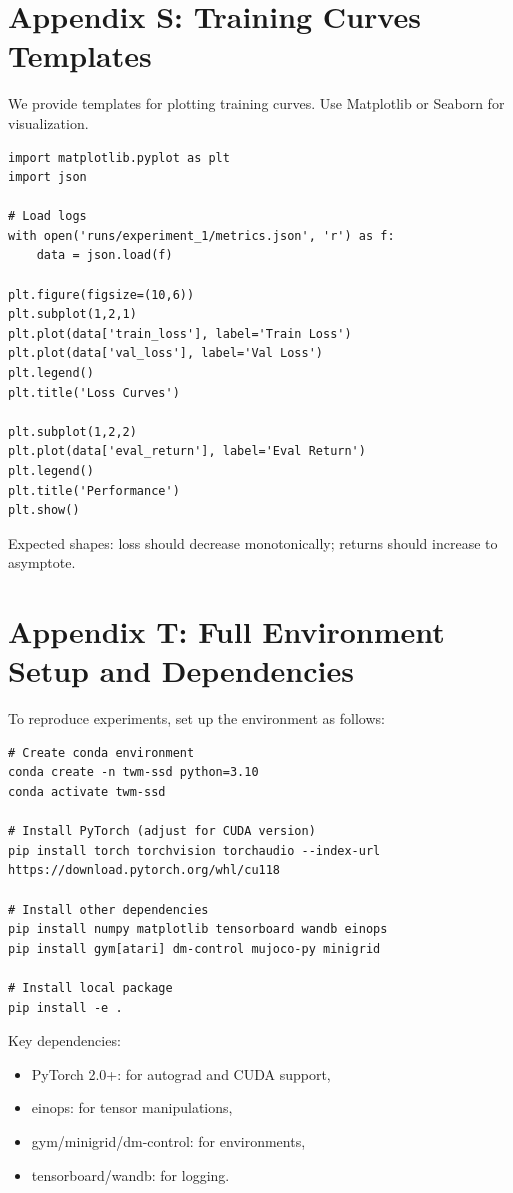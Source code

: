\documentclass{article}
\begin{document}
\section{Appendix S: Training Curves Templates}
We provide templates for plotting training curves. Use Matplotlib or Seaborn for visualization.

\begin{verbatim}
import matplotlib.pyplot as plt
import json

# Load logs
with open('runs/experiment_1/metrics.json', 'r') as f:
    data = json.load(f)

plt.figure(figsize=(10,6))
plt.subplot(1,2,1)
plt.plot(data['train_loss'], label='Train Loss')
plt.plot(data['val_loss'], label='Val Loss')
plt.legend()
plt.title('Loss Curves')

plt.subplot(1,2,2)
plt.plot(data['eval_return'], label='Eval Return')
plt.legend()
plt.title('Performance')
plt.show()
\end{verbatim}

Expected shapes: loss should decrease monotonically; returns should increase to asymptote.

\section{Appendix T: Full Environment Setup and Dependencies}
To reproduce experiments, set up the environment as follows:

\begin{verbatim}
# Create conda environment
conda create -n twm-ssd python=3.10
conda activate twm-ssd

# Install PyTorch (adjust for CUDA version)
pip install torch torchvision torchaudio --index-url https://download.pytorch.org/whl/cu118

# Install other dependencies
pip install numpy matplotlib tensorboard wandb einops
pip install gym[atari] dm-control mujoco-py minigrid

# Install local package
pip install -e .
\end{verbatim}

Key dependencies:
\begin{itemize}
  \item PyTorch 2.0+: for autograd and CUDA support,
  \item einops: for tensor manipulations,
  \item gym/minigrid/dm-control: for environments,
  \item tensorboard/wandb: for logging.
\end{itemize}
\end{document}
